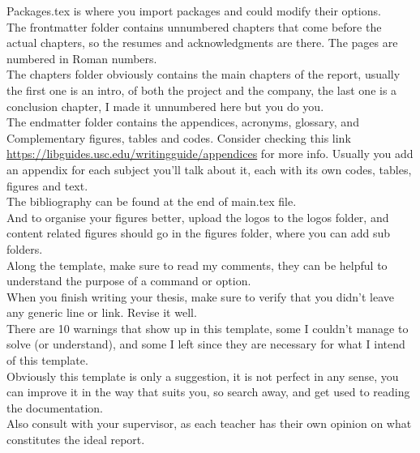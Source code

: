 Packages.tex is where you import packages and could modify their options.
\\

The frontmatter folder contains unnumbered chapters that come before the actual chapters, so the resumes and acknowledgments are there. The pages are numbered in Roman numbers.
\\

The chapters folder obviously contains the main chapters of the report, usually the first one is an intro, of both the project and the company, the last one is a conclusion chapter, I made it unnumbered here but you do you.
\\

The endmatter folder contains the appendices, acronyms, glossary, and Complementary figures, tables and codes. Consider checking this link \url{https://libguides.usc.edu/writingguide/appendices} for more info. Usually you add an appendix for each subject you'll talk about it, each with its own codes, tables, figures and text.
\\

The bibliography can be found at the end of main.tex file.
\\

And to organise your figures better, upload the logos to the logos folder, and content related figures should go in the figures folder, where you can add sub folders.
\\

Along the template, make sure to read my comments, they can be helpful to understand the purpose of a command or option. 
\\

When you finish writing your thesis, make sure to verify that you didn't leave any generic line or link. Revise it well.
\\

There are 10 warnings that show up in this template, some I couldn't manage to solve (or understand), and some I left since they are necessary for what I intend of this template.
\\

Obviously this template is only a suggestion, it is not perfect in any sense, you can improve it in the way that suits you, so search away, and get used to reading the documentation.
\\

Also consult with your supervisor, as each teacher has their own opinion on what constitutes the ideal report.
\\

